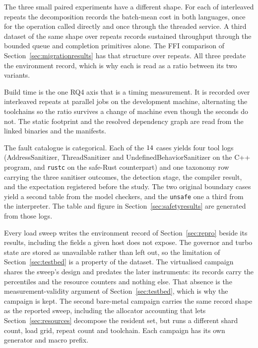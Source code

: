 \documentclass[english,oneside,a4paper,censored,csm,software-track-2020]{HYthesisML}
\begin{document}
\begin{appendices}
The three small paired experiments have a different shape. For each of \BudgetRepeats{}
interleaved repeats the decomposition records the batch-mean cost in both languages, once for
the operation called directly and once through the threaded service. A third dataset of the same
shape over \ContentionRepeats{} repeats records sustained throughput through the bounded queue and
completion primitives alone. The FFI comparison of
Section~\ref{sec:migrationresults} has that structure over \FfiOpRepeats{} repeats. All three
predate the environment record, which is why each is read as a ratio between its two variants.

Build time is the one RQ4 axis that is a timing measurement. It is recorded over
\AdoptRepeats{} interleaved repeats at \AdoptJobs{} parallel jobs on the development machine,
alternating the toolchains so the ratio survives a change of machine even though the seconds do
not. The static footprint and the resolved dependency graph are read from the linked binaries
and the manifests.

The fault catalogue is categorical. Each of the $14$ cases yields four tool logs
(AddressSanitizer, ThreadSanitizer and UndefinedBehaviorSanitizer on the C++ program, and
\texttt{rustc} on the safe-Rust counterpart) and one taxonomy row carrying the three sanitiser
outcomes, the detection stage, the compiler result, and the expectation registered before the
study. The two original boundary cases yield a second table from the model checkers, and the
\texttt{unsafe} one a third from the interpreter. The table and figure in
Section~\ref{sec:safetyresults} are generated from those logs.

Every load sweep writes the environment record of Section~\ref{sec:repro} beside its results,
including the fields a given host does not expose. The governor and turbo state are stored as
unavailable rather than left out, so the limitation of Section~\ref{sec:testbed} is a property
of the dataset. The virtualised campaign shares the sweep's design and predates the later
instruments: its records carry the percentiles and the resource counters and nothing else. That
absence is the measurement-validity argument of Section~\ref{sec:testbed}, which is why the
campaign is kept. The second bare-metal campaign carries the same record shape as the reported
sweep, including the allocator accounting that lets Section~\ref{sec:resources} decompose the
resident set, but runs a different shard count, load grid, repeat count and toolchain. Each
campaign has its own generator and macro prefix.


\end{appendices}
\end{document}
